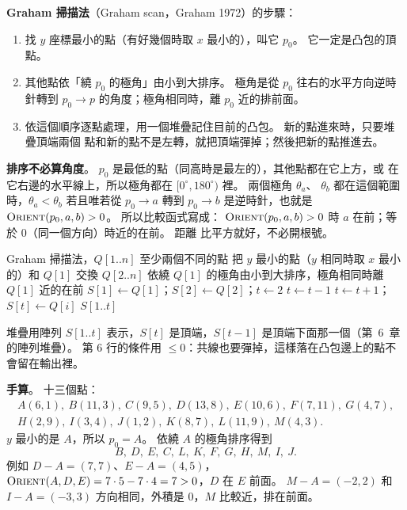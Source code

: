 \textbf{Graham 掃描法}（Graham scan，Graham 1972）的步驟：

\begin{enumerate}
\item 找 $y$ 座標最小的點（有好幾個時取 $x$ 最小的），叫它 $p_0$。 它一定是凸包的頂
點。
\item 其他點依「繞 $p_0$ 的極角」由小到大排序。 極角是從 $p_0$ 往右的水平方向逆時
針轉到 $p_0 \to p$ 的角度；極角相同時，離 $p_0$ 近的排前面。
\item 依這個順序逐點處理，用一個堆疊記住目前的凸包。 新的點進來時，只要堆疊頂端兩個
點和新的點不是左轉，就把頂端彈掉；然後把新的點推進去。
\end{enumerate}

\textbf{排序不必算角度}。 $p_0$ 是最低的點（同高時是最左的），其他點都在它上方，或
在它右邊的水平線上，所以極角都在 $[0^\circ, 180^\circ)$ 裡。 兩個極角 $\theta_a$、
$\theta_b$ 都在這個範圍時，$\theta_a < \theta_b$ 若且唯若從 $p_0 \to a$ 轉到
$p_0 \to b$ 是逆時針，也就是 $\proc{Orient}(p_0, a, b) > 0$。 所以比較函式寫成：
$\proc{Orient}(p_0, a, b) > 0$ 時 $a$ 在前；等於 $0$（同一個方向）時近的在前。 距離
比平方就好，不必開根號。

\begin{pseudo}[label=alg:dc-graham]{Graham 掃描法，$Q[1..n]$ 至少兩個不同的點}
    \State 把 $y$ 最小的點（$y$ 相同時取 $x$ 最小的）和 $Q[1]$ 交換
    \State $Q[2..n]$ 依繞 $Q[1]$ 的極角由小到大排序，極角相同時離 $Q[1]$ 近的在前
    \State $S[1] \gets Q[1]$；$S[2] \gets Q[2]$；$t \gets 2$ 
            \State $t \gets t - 1$ 
        \EndWhile
        \State $t \gets t + 1$；$S[t] \gets Q[i]$ 
    \EndFor
    \State \Return $S[1..t]$
\EndFunction
\end{pseudo}

堆疊用陣列 $S[1..t]$ 表示，$S[t]$ 是頂端，$S[t-1]$ 是頂端下面那一個（第~6~章的陣列堆疊）。
第 6 行的條件用 $\le 0$：共線也要彈掉，這樣落在凸包邊上的點不會留在輸出裡。

\textbf{手算}。 十三個點：
\[
\begin{gathered}
A(6, 1),\ B(11, 3),\ C(9, 5),\ D(13, 8),\ E(10, 6),\ F(7, 11),\ G(4, 7), \\
H(2, 9),\ I(3, 4),\ J(1, 2),\ K(8, 7),\ L(11, 9),\ M(4, 3).
\end{gathered}
\]
$y$ 最小的是 $A$，所以 $p_0 = A$。 依繞 $A$ 的極角排序得到
\[
B,\ D,\ E,\ C,\ L,\ K,\ F,\ G,\ H,\ M,\ I,\ J.
\]
例如 $D - A = (7, 7)$、$E - A = (4, 5)$，$\proc{Orient}(A, D, E) = 7 \cdot 5 - 7 \cdot 4
= 7 > 0$，$D$ 在 $E$ 前面。 $M - A = (-2, 2)$ 和 $I - A = (-3, 3)$ 方向相同，外積是
$0$，$M$ 比較近，排在前面。

